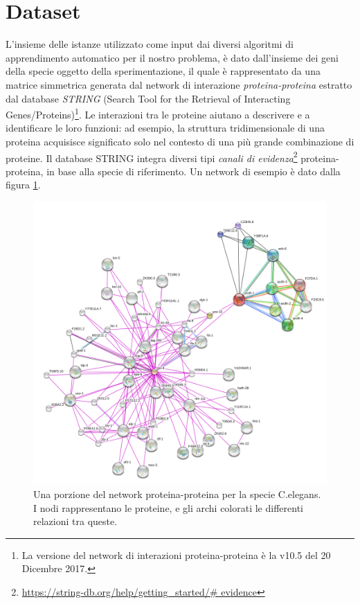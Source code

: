\documentclass[12pt]{report}
\begin{document}
\section{Dataset}
L'insieme delle istanze utilizzato come input dai diversi algoritmi di apprendimento automatico per il nostro problema, è dato dall'insieme dei geni della specie oggetto della sperimentazione, il quale è rappresentato da una matrice simmetrica generata dal network di interazione \emph{proteina-proteina} estratto dal database \emph{STRING} (Search Tool for the Retrieval of Interacting Genes/Proteins)\footnote{\footnotesize{La versione del network di interazioni proteina-proteina è la v10.5 del 20 Dicembre 2017.}}\cite{STRING}. Le interazioni tra le proteine aiutano a descrivere e a identificare le loro funzioni: ad esempio, la struttura tridimensionale di una proteina acquisisce significato solo nel contesto di una più grande combinazione di proteine. Il database STRING integra diversi tipi \emph{canali di evidenza}\footnote{\footnotesize{\url{https://string-db.org/help/getting_started/\# evidence}}} proteina-proteina, in base alla specie di riferimento. Un network di esempio è dato dalla figura \ref{string-net}.
\begin{figure}[h]
\center
\includegraphics[scale=0.45]{./images/STRING-NET.png}
\caption{\footnotesize{Una porzione del network proteina-proteina per la specie C.elegans. I nodi rappresentano le proteine, e gli archi colorati le differenti relazioni tra queste.}}
\label{string-net}
\end{figure}
\end{document}
